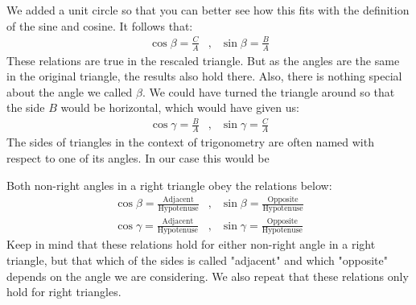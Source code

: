 \noindent We added a unit circle so that you can better see how this fits with the definition of the sine and cosine. It follows that:
\begin{eqnarray*}
\cos \beta = \frac{C}{A} & , & \sin \beta = \frac{B}{A}
\end{eqnarray*}
\noindent These relations are true in the rescaled triangle. But as the angles are the same in the original triangle, the results also hold there. Also, there is nothing special about the angle we called $\beta$. We could have turned the triangle around so that the side $B$ would be horizontal, which would have given us:
\begin{eqnarray*}
\cos \gamma = \frac{B}{A} & , & \sin \gamma = \frac{C}{A}
\end{eqnarray*}
\noindent The sides of triangles in the context of trigonometry are often named with respect to one of its angles. In our case this would be
\begin{center}
\end{center}
\noindent Both non-right angles in a right triangle obey the relations below:
\begin{eqnarray*}
\cos \beta = \frac{\text{Adjacent}}{\text{Hypotenuse}} & , & \sin \beta = \frac{\text{Opposite}}{\text{Hypotenuse}} \\
\cos \gamma = \frac{\text{Adjacent}}{\text{Hypotenuse}} & , & \sin \gamma = \frac{\text{Opposite}}{\text{Hypotenuse}}
\end{eqnarray*}
\noindent Keep in mind that these relations hold for either non-right angle in a right triangle, but that which of the sides is called "adjacent" and which "opposite" depends on the angle we are considering. We also repeat that these relations only hold for right triangles.\\

